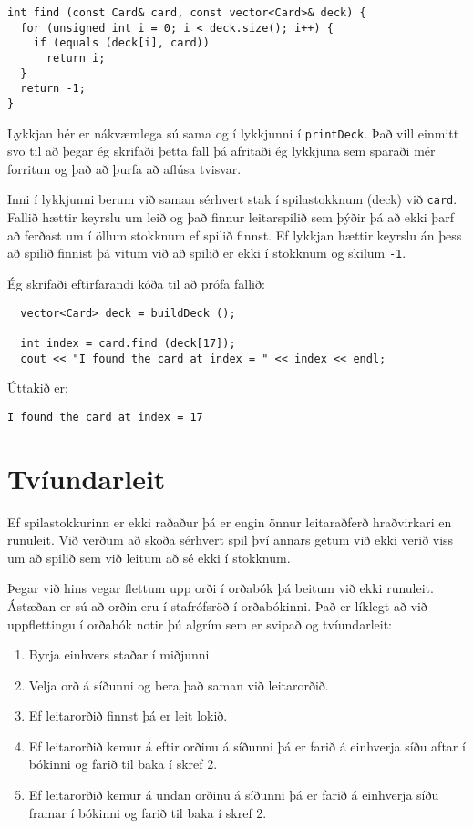 \begin{verbatim}
int find (const Card& card, const vector<Card>& deck) {
  for (unsigned int i = 0; i < deck.size(); i++) {
    if (equals (deck[i], card)) 
      return i;
  }
  return -1;
}
\end{verbatim}
%
Lykkjan hér er nákvæmlega sú sama og í lykkjunni í {\tt printDeck}.
Það vill einmitt svo til að þegar ég skrifaði þetta fall þá afritaði ég lykkjuna sem sparaði mér forritun
og það að þurfa að aflúsa tvisvar.

Inni í lykkjunni berum við saman sérhvert stak í spilastokknum (deck) við {\tt card}.
Fallið hættir keyrslu um leið og það finnur leitarspilið sem þýðir þá að ekki þarf að ferðast um
í öllum stokknum ef spilið finnst.
Ef lykkjan hættir keyrslu án þess að spilið finnist þá vitum við að spilið er ekki í stokknum og skilum {\tt -1}.


Ég skrifaði eftirfarandi kóða til að prófa fallið: 

\begin{verbatim}
  vector<Card> deck = buildDeck ();

  int index = card.find (deck[17]);
  cout << "I found the card at index = " << index << endl;
\end{verbatim}
%
Úttakið er:
\begin{verbatim}
I found the card at index = 17
\end{verbatim}
%

\section{Tvíundarleit}

Ef spilastokkurinn er ekki raðaður þá er engin önnur leitaraðferð hraðvirkari en runuleit.
Við verðum að skoða sérhvert spil því annars getum við ekki verið viss um að spilið sem við leitum að sé ekki í stokknum.

Þegar við hins vegar flettum upp orði í orðabók þá beitum við ekki runuleit.
Ástæðan er sú að orðin eru í stafrófsröð í orðabókinni.
Það er líklegt að við uppflettingu í orðabók notir þú algrím sem er svipað og tvíundarleit:

\begin {enumerate}

\item Byrja einhvers staðar í miðjunni. 

\item Velja orð á síðunni og bera það saman við leitarorðið.

\item Ef leitarorðið finnst þá er leit lokið. 

\item Ef leitarorðið kemur á eftir orðinu á síðunni þá er farið á einhverja síðu aftar í bókinni og farið til baka í skref 2. 

\item Ef leitarorðið kemur á undan orðinu á síðunni þá er farið á einhverja síðu framar í bókinni og farið til baka í skref 2.

\end {enumerate}

